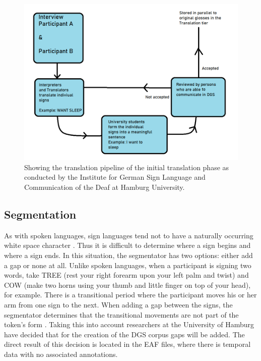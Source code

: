 \begin{figure}[h]
\caption{Showing the translation pipeline of the initial translation phase as conducted by the Institute for German Sign Language and Communication of the Deaf at Hamburg University. \cite{konradoffentliches} }
 \centering 
 \includegraphics[width=14cm]{Bachelor CSAI thesis template/images/translation_pipeline.png}
 
 \label{fig:uselesspipeline}
\end{figure}

\subsection{Segmentation}

As with spoken languages, sign languages tend not to have a naturally occurring white space character \cite{hankesegmentation} \cite{konradoffentliches}. Thus it is difficult to determine where a sign begins and where a sign ends. In this situation, the segmentator has two options: either add a gap or none at all. Unlike spoken languages, when a participant is signing two words, take TREE (rest your right forearm upon your left palm and twist) \cite{perniss2007space} and COW (make two horns using your thumb and little finger on top of your head), for example. There is a transitional period where the participant moves his or her arm from one sign to the next. When adding a gap between the signs, the segmentator determines that the transitional movements are not part of the token's form \cite{konradoffentliches}. Taking this into account researchers at the University of Hamburg have decided that for the creation of the DGS corpus gaps will be added. The direct result of this decision is located in the EAF files, where there is temporal data with no associated annotations.

